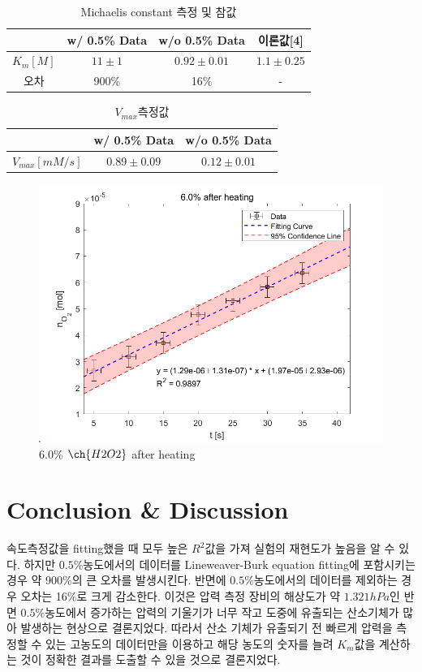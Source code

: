 \documentclass[%
 reprint,
 amsmath,amssymb,
 aps,
]{revtex4-2}
\begin{document}
\begin{table}[]
\begin{tabular}{c|c|c|c} \hline \hline
& w/ 0.5\% Data & w/o 0.5\% Data  & 이론값[4] \\ \hline
$K_{m} [M]$ & $11\pm1$  & $0.92 \pm 0.01 $ & $1.1 \pm 0.25$ \\  \hline
오차& 900\% & 16\% & - \\  \hline \hline 
\end{tabular}
\caption{\label{tab:KM}Michaelis constant 측정 및 참값}
\end{table}

\begin{table}[]
\begin{tabular}{c|c|c} \hline \hline
& w/ 0.5\% Data & w/o 0.5\% Data\\ \hline
$V_{max} [mM/s]$ & $0.89 \pm 0.09 $  & $0.12 \pm 0.01 $\\  \hline \hline 
\end{tabular}
\caption{\label{tab:VMAX} $V_{max}$측정값}
\end{table}

\begin{figure}[htbp]
	\includegraphics[width = 0.9\linewidth]{HEAT_60.png}%
	\caption{\label{fig:HEAT_60}6.0\% $\ch{H2O2}$ after heating}
\end{figure}

\section{\label{sec:level1}Conclusion \& Discussion}
속도측정값을 fitting했을 때 모두 높은 $R^{2}$값을 가져 실험의 재현도가 높음을 알 수 있다. 하지만  $0.5\%$농도에서의 데이터를 Lineweaver-Burk equation fitting에 포함시키는 경우 약 900\%의 큰 오차를 발생시킨다. 반면에 $0.5\%$농도에서의 데이터를 제외하는 경우 오차는 16\%로 크게 감소한다. 이것은 압력 측정 장비의 해상도가 약 $1.321hPa$인 반면 $0.5\%$농도에서 증가하는 압력의 기울기가 너무 작고 도중에 유출되는 산소기체가 많아 발생하는 현상으로 결론지었다. 따라서 산소 기체가 유출되기 전 빠르게 압력을 측정할 수 있는 고농도의 데이터만을 이용하고 해당 농도의 숫자를 늘려 $K_{m}$값을 계산하는 것이 정확한 결과를 도출할 수 있을 것으로 결론지었다. 
\end{document}

